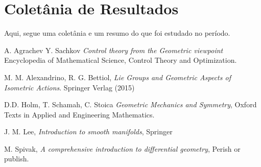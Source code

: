 \documentclass[11pt]{amsart}
\newcommand{\<}[0]{\langle}
\renewcommand{\>}[0]{\rangle}
\begin{document}
\part{Coletânia de Resultados}

Aqui, segue uma coletânia e um resumo do que foi estudado no período.






\begin{thebibliography}{99}






 A. Agrachev Y. Sachkov
\emph{Control theory from the Geometric viewpoint }
Encyclopedia of Mathematical Science, Control Theory and
Optimization.  

 M. M. Alexandrino,  R. G. Bettiol, 
\emph{Lie Groups and Geometric Aspects of Isometric Actions}. Springer Verlag  (2015)  


 D.D. Holm, T. Schamah, C. Stoica
\emph{Geometric Mechanics and Symmetry}, Oxford Texts 
in Applied and Engineering Mathematics.

 J. M. Lee, \emph{Introduction to smooth manifolds}, Springer 

 M. Spivak, 
\emph{A comprehensive introduction to differential geometry}, Perish or publish. 











\end{thebibliography}
\end{document}
